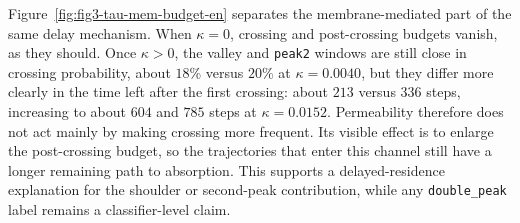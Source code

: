 \documentclass[11pt]{article}
\begin{document}
Figure~\ref{fig:fig3-tau-mem-budget-en} separates the membrane-mediated part of the same
delay mechanism. When $\kappa=0$, crossing and post-crossing budgets vanish, as they
should. Once $\kappa>0$, the valley and \texttt{peak2} windows are still close in
crossing probability, about $18\%$ versus $20\%$ at $\kappa=0.0040$, but they differ
more clearly in the time left after the first crossing: about $213$ versus $336$ steps,
increasing to about $604$ and $785$ steps at $\kappa=0.0152$. Permeability therefore
does not act mainly by making crossing more frequent. Its visible effect is to enlarge
the post-crossing budget, so the trajectories that enter this channel still have a
longer remaining path to absorption. This supports a delayed-residence explanation for
the shoulder or second-peak contribution, while any \texttt{double\_peak} label remains
a classifier-level claim.
\end{document}

